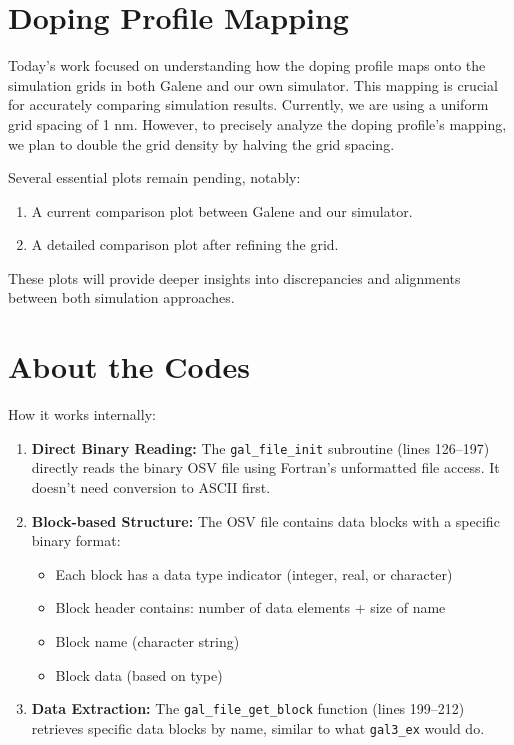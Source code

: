 \section{Doping Profile Mapping}


Today's work focused on understanding how the doping profile maps onto the simulation grids in both Galene and our own simulator. This mapping is crucial for accurately comparing simulation results. Currently, we are using a uniform grid spacing of 1 nm. However, to precisely analyze the doping profile's mapping, we plan to double the grid density by halving the grid spacing.

Several essential plots remain pending, notably:

\begin{enumerate}
\item A current comparison plot between Galene and our simulator.
\item A detailed comparison plot after refining the grid.
\end{enumerate}

These plots will provide deeper insights into discrepancies and alignments between both simulation approaches.

\section{About the Codes}

How it works internally:

\begin{enumerate}
  \item \textbf{Direct Binary Reading:} The \texttt{gal\_file\_init} subroutine (lines 126--197) directly reads the binary OSV file using Fortran's unformatted file access. It doesn't need conversion to ASCII first.
  \item \textbf{Block-based Structure:} The OSV file contains data blocks with a specific binary format:
    \begin{itemize}
      \item Each block has a data type indicator (integer, real, or character)
      \item Block header contains: number of data elements + size of name
      \item Block name (character string)
      \item Block data (based on type)
    \end{itemize}
  \item \textbf{Data Extraction:} The \texttt{gal\_file\_get\_block} function (lines 199--212) retrieves specific data blocks by name, similar to what \texttt{gal3\_ex} would do.
\end{enumerate}

